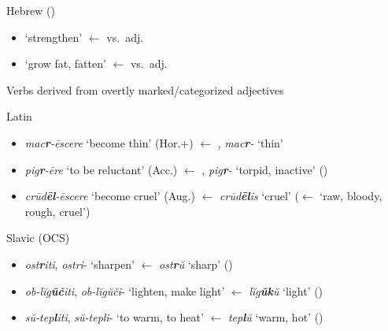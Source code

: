 \documentclass[output=paper,colorlinks,citecolor=brown]{langscibook}
\begin{document}
\begin{exe}
\begin{xlist}
\begin{xlist}
\begin{itemize}
        \end{itemize}  
        \ex Hebrew (\citealt[749; 743]{Arad2003}) \label{ex:hebrewdeadj1}
        \begin{itemize}
            \item     {} `strengthen' $\leftarrow$  vs.\ adj.\ 
                  \item  {} `grow fat, fatten' $\leftarrow$  vs.\ adj.\ 
        \end{itemize}
        \end{xlist}
        \ex Verbs derived from overtly marked/categorized adjectives \label{ex:deadj2}
        \begin{xlist}
        \ex Latin \label{ex:latdeadj2}
        \begin{itemize}
            \item   \textit{mac\textbf{r}-ēscere}  `become thin' (Hor.+) $\leftarrow$ , \textit{mac\textbf{r}-} `thin'
                   \item \textit{pig\textbf{r}-ēre}  `to be reluctant' (Acc.) $\leftarrow$ , \textit{pig\textbf{r}-} `torpid, inactive' ()
                    \item \textit{crūd\textbf{ēl}-ēscere}  `become cruel' (Aug.) $\leftarrow$ \textit{crūd\textbf{ēl}is} `cruel' ($\leftarrow$  \mbox{} `raw, bloody, rough, cruel')
        \end{itemize}   
        \ex Slavic (OCS) \label{ex:slavdeadj2}    
        \begin{itemize}
            \item         \textit{ost\textbf{r}iti},  \textit{ostri}- `sharpen' $\leftarrow$  \textit{ost\textbf{r}ŭ}  `sharp' ()
                  \item \textit{ob-lĭg\textbf{ŭč}iti},  \textit{ob-lĭgŭči}- `lighten, make light'  $\leftarrow$  \textit{lĭg\textbf{ŭk}ŭ} `light'  \newline ()
                  \item  \textit{sŭ-tep\textbf{l}iti},  \textit{sŭ-tepli}- `to warm, to heat' $\leftarrow$  \textit{tep\textbf{l}ŭ} `warm, hot' ()

\end{itemize}
\end{xlist}
\end{xlist}
\end{exe}
\end{document}
